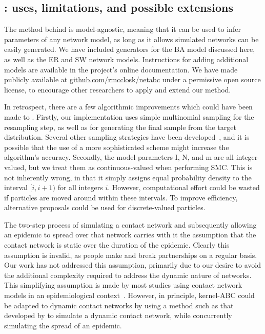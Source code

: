 \subsection{: uses, limitations, and possible extensions}

The method behind  is model-agnostic, meaning that it can be
used to infer parameters of any network model, as long as it allows simulated
networks can be easily generated. We have included generators for the \gls{BA}
model discussed here, as well as the \gls{ER} and \gls{SW} network models.
Instructions for adding additional models are available in the project's online
documentation. We have made  publicly available at
\url{github.com/rmcclosk/netabc} under a permissive open source license, to
encourage other researchers to apply and extend our method.

In retrospect, there are a few algorithmic improvements which could have been
made to . Firstly, our implementation uses simple multinomial
sampling for the resampling step, as well as for generating the final sample
from the target distribution.  Several other sampling strategies have been
developed~\autocite{douc2005comparison}, and it is possible that the use of a
more sophisticated scheme might increase the algorithm's accuracy. Secondly,
the model parameters \gls{I}, \gls{N}, and \gls{m} are all integer-valued, but
we treat them as continuous-valued when performing \gls{SMC}. This is not
inherently wrong, in that it simply assigns equal probability density to the
interval $[i, i+1)$ for all integers $i$. However, computational effort could
be wasted if particles are moved around within these intervals. To improve
efficiency, alternative proposals could be used for discrete-valued particles.


The two-step process of simulating a contact network and subsequently allowing
an epidemic to spread over that network carries with it the assumption that the
contact network is static over the duration of the epidemic. Clearly this
assumption is invalid, as people make and break partnerships on a regular
basis. Our work has not addressed this assumption, primarily due to our desire
to avoid the additional complexity required to address the dynamic nature of
networks. This simplifying assumption is made by most studies using contact
network models in an epidemiological context~\autocite{welch2011statistical,
bansal2007individual}. However, in principle, kernel-\gls{ABC} could be
adapted to dynamic contact networks by using a method such as that developed by
\textcite{robinson2012dynamics} to simulate a dynamic contact network, while
concurrently simulating the spread of an epidemic.

